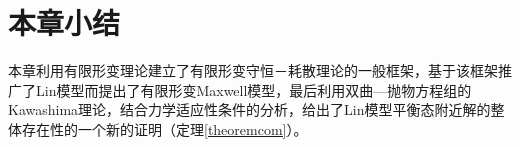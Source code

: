 

\section{本章小结}
本章利用有限形变理论建立了有限形变守恒－耗散理论的一般框架，基于该框架推广了Lin模型而提出了有限形变Maxwell模型，最后利用双曲—抛物方程组的Kawashima理论，结合力学适应性条件的分析，给出了Lin模型平衡态附近解的整体存在性的一个新的证明（定理\ref{theoremcom}）。


% 
% 
% 